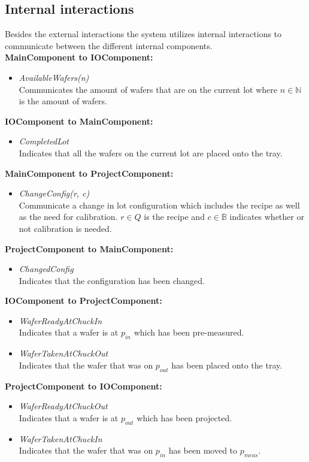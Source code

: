 \subsection{Internal interactions}
Besides the external interactions the system utilizes internal interactions to communicate between the different internal components. \\
\textbf{MainComponent to IOComponent:}
	\begin{itemize}
	\item  \textit{AvailableWafers(n)}\\
	Communicates the amount of wafers that are on the current lot where $n \in \mathbb{N}$ is the amount of wafers.
	\end{itemize}
\textbf{IOComponent to MainComponent:}
	\begin{itemize}
	\item  \textit{CompletedLot}\\
	Indicates that all the wafers on the current lot are placed onto the tray.
	\end{itemize}
\textbf{MainComponent to ProjectComponent:}
	\begin{itemize}
	\item  \textit{ChangeConfig(r, c)}\\
	Communicate a change in lot configuration which includes the recipe as well as the need for calibration. $r \in Q$ is the recipe and $c \in \mathbb{B}$ indicates whether or not calibration is needed.
	\end{itemize}
\textbf{ProjectComponent to MainComponent:}
	\begin{itemize}
	\item  \textit{ChangedConfig}\\
	Indicates that the configuration has been changed.
	\end{itemize}
\textbf{IOComponent to ProjectComponent:}
	\begin{itemize}
	\item  \textit{WaferReadyAtChuckIn}\\
	Indicates that a wafer is at $p_\mathit{in}$ which has been pre-measured.
	\item  \textit{WaferTakenAtChuckOut}\\
	Indicates that the wafer that was on $p_\mathit{out}$ has been placed onto the tray.
	\end{itemize}
\textbf{ProjectComponent to IOComponent:}
	\begin{itemize}
	\item  \textit{WaferReadyAtChuckOut}\\
	Indicates that a wafer is at $p_\mathit{out}$ which has been projected.
	\item  \textit{WaferTakenAtChuckIn}\\
	Indicates that the wafer that was on $p_\mathit{in}$ has been moved to $p_\mathit{meas}$.
	\end{itemize}
